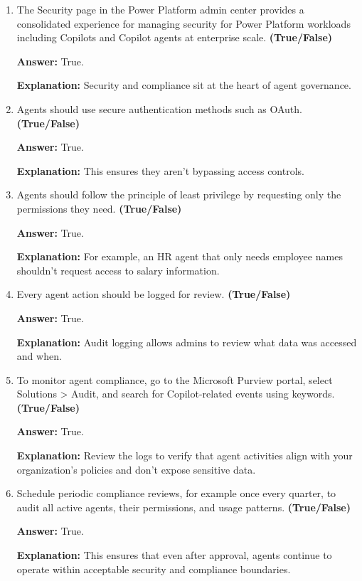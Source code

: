 \documentclass[10pt]{article}
\begin{document}
\begin{enumerate}[leftmargin=*]
\item The Security page in the Power Platform admin center provides a consolidated experience for managing security for Power Platform workloads including Copilots and Copilot agents at enterprise scale. \textbf{(True/False)}

\textbf{Answer:} True.

\textbf{Explanation:} Security and compliance sit at the heart of agent governance.

\item Agents should use secure authentication methods such as OAuth. \textbf{(True/False)}

\textbf{Answer:} True.

\textbf{Explanation:} This ensures they aren't bypassing access controls.

\item Agents should follow the principle of least privilege by requesting only the permissions they need. \textbf{(True/False)}

\textbf{Answer:} True.

\textbf{Explanation:} For example, an HR agent that only needs employee names shouldn’t request access to salary information.

\item Every agent action should be logged for review. \textbf{(True/False)}

\textbf{Answer:} True.

\textbf{Explanation:} Audit logging allows admins to review what data was accessed and when.

\item To monitor agent compliance, go to the Microsoft Purview portal, select Solutions > Audit, and search for Copilot-related events using keywords. \textbf{(True/False)}

\textbf{Answer:} True.

\textbf{Explanation:} Review the logs to verify that agent activities align with your organization’s policies and don’t expose sensitive data.

\item Schedule periodic compliance reviews, for example once every quarter, to audit all active agents, their permissions, and usage patterns. \textbf{(True/False)}

\textbf{Answer:} True.

\textbf{Explanation:} This ensures that even after approval, agents continue to operate within acceptable security and compliance boundaries.

\end{enumerate}
\end{document}
